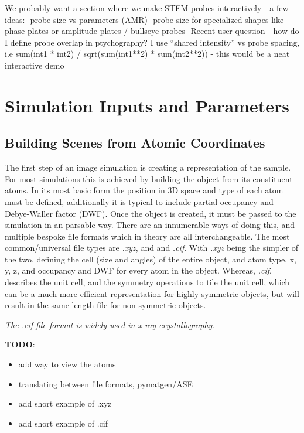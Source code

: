 \documentclass[%
 superscriptaddress,
 aip,
 amsmath,amssymb,
preprint,%
 author-year,%
longbibliography
]{revtex4-2}
\begin{document}
We probably want a section where we make STEM probes interactively - a few ideas:
-probe size vs parameters (AMR)
-probe size for specialized shapes like phase plates or amplitude plates / bullseye probes
-Recent user question - how do I define probe overlap in ptychography?  I use ``shared intensity'' vs probe spacing, i.e sum(int1 * int2) / sqrt(sum(int1**2) * sum(int2**2)) - this would be a neat interactive demo 


\section*{Simulation Inputs and Parameters}\label{sim_inputs}

\subsection*{Building Scenes from Atomic Coordinates}
The first step of an image simulation is creating a representation of the sample. For most simulations this is achieved by building the object from its constituent atoms. In its most basic form the position in 3D space and type of each atom must be defined, additionally it is typical to include partial occupancy and Debye-Waller factor (DWF). Once the object is created, it must be passed to the simulation in an parsable way. There are an innumerable ways of doing this, and multiple bespoke file formats which in theory are all interchangeable. The most common/universal file types are \emph{.xyz}, and and \emph{.cif}. With \emph{.xyz} being the simpler of the two, defining the cell (size and angles) of the entire object, and atom type, x, y, z, and  occupancy and DWF for every atom in the object. Whereas, \emph{.cif}, describes the unit cell, and the symmetry operations to tile the unit cell, which can be a much more efficient representation for highly symmetric objects, but will result in the same length file for non symmetric objects. 

 



\emph{The \emph{.cif} file format is widely used in x-ray crystallography.}

\textbf{TODO}: 
\begin{itemize}
    \item add way to view the atoms
    \item translating between file formats, pymatgen/ASE
    \item add short example of .xyz
    \item add short example of .cif
\end{itemize}
\end{document}
